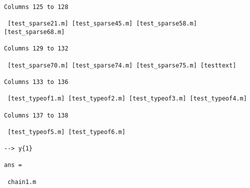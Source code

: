 \begin{verbatim}
Columns 125 to 128

 [test_sparse21.m] [test_sparse45.m] [test_sparse58.m] [test_sparse68.m] 
 
Columns 129 to 132

 [test_sparse70.m] [test_sparse74.m] [test_sparse75.m] [testtext] 
 
Columns 133 to 136

 [test_typeof1.m] [test_typeof2.m] [test_typeof3.m] [test_typeof4.m] 
 
Columns 137 to 138

 [test_typeof5.m] [test_typeof6.m] 

--> y{1}

ans = 

 chain1.m
\end{verbatim}
